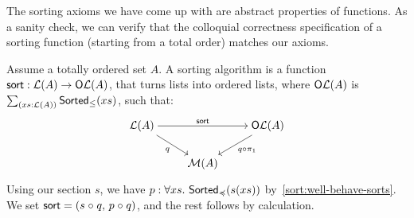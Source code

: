The sorting axioms we have come up with are abstract properties of functions.
%
As a sanity check, we can verify that the colloquial correctness specification of a sorting function (starting from a
total order) matches our axioms.
%
\begin{proposition}
    \label{prop:sort-correctness}
    Assume a totally ordered set $A$.
    A sorting algorithm is a function $\operatorname{\mathsf{sort}} : \mathcal{L}(A) \to \mathsf{O}\mathcal{L}(A)$,
    that turns lists into ordered lists,
    where $\mathsf{O}\mathcal{L}(A)$ is $\dsum{xs : \LL(A)}{\term{Sorted}_{\leq}(xs)}$,
    such that:
    \[\begin{tikzcd}[ampersand replacement=\&,cramped]
            {\LL(A)} \&\& {\type{O}\LL(A)} \\
            \& {\MM(A)}
            \arrow["{\term{sort}}", from=1-1, to=1-3]
            \arrow["q"', from=1-1, to=2-2]
            \arrow["{q \comp \pi_1}", from=1-3, to=2-2]
        \end{tikzcd}\]
\end{proposition}
\begin{proofsketch}
    Using our section $s$,
    we have $p : \forall xs.\,\operatorname{\mathsf{Sorted}}_{\preccurlyeq}(s(xs))$ by~\cref{sort:well-behave-sorts}.
    We set $\operatorname{\mathsf{sort}} = (s \mathrel{\circ} q ,\,p \mathrel{\circ} q)$, and the rest follows by calculation.
\end{proofsketch}